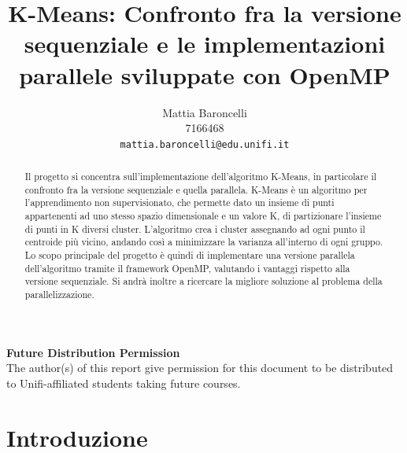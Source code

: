 \documentclass[10pt,twocolumn,letterpaper]{article}
\begin{document}
\title{K-Means: Confronto fra la versione sequenziale e le implementazioni parallele sviluppate con OpenMP }

\author{Mattia Baroncelli\\
7166468\\
{\tt\small mattia.baroncelli@edu.unifi.it}
}

\maketitle
\thispagestyle{empty}

\begin{abstract}
   Il progetto si concentra sull'implementazione dell'algoritmo K-Means, in particolare il confronto fra la versione sequenziale e quella parallela. K-Means è un algoritmo per l'apprendimento non supervisionato, che permette dato un insieme di punti appartenenti ad uno stesso spazio dimensionale e un valore K, di partizionare l'insieme di punti in K diversi cluster. L'algoritmo crea i cluster assegnando ad ogni punto il centroide più vicino, andando così a minimizzare la varianza all'interno di ogni gruppo. Lo scopo principale del progetto è quindi di implementare una versione parallela dell'algoritmo tramite il framework OpenMP, valutando i vantaggi rispetto alla versione sequenziale. Si andrà inoltre a ricercare la migliore soluzione al problema della parallelizzazione.
\end{abstract}

\noindent\textbf{Future Distribution Permission}\\
\indent The author(s) of this report give permission for this document to be distributed to Unifi-affiliated students taking future courses.

\section{Introduzione}
\end{document}

